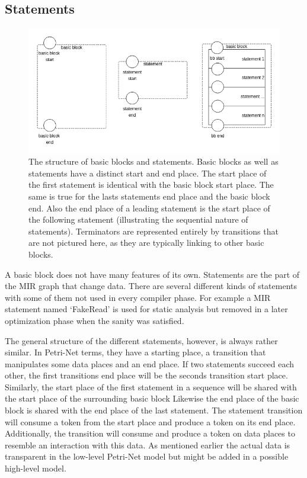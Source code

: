 \subsection{Statements}
\begin{figure}
    \centering
    \includegraphics[width=.9\textwidth]{../diagrams/basic_blocks.png}
    \caption{
        The structure of basic blocks and statements.
        Basic blocks as well as statements have a distinct start and end place.
        The start place of the first statement is identical with the basic block start place.
        The same is true for the lasts statements end place and the basic block end.
        Also the end place of a leading statement is the start place of the following statement (illustrating the sequential nature of statements).
        Terminators are represented entirely by transitions that are not pictured here, as they are typically linking to other basic blocks.
    }
    \label{basic_block_trans}
\end{figure}A basic block does not have many features of its own.
Statements are the part of the MIR graph that change data.
There are several different kinds of statements with some of them not used in every compiler phase.
For example a MIR statement named `FakeRead' is used for static analysis but removed in a later optimization phase when the sanity was satisfied.

The general structure of the different statements, however, is always rather similar.
In Petri-Net terms, they have a starting place, a transition that manipulates some data places and an end place.
If two statements succeed each other, the first transitions end place will be the seconds transition start place.
Similarly, the start place of the first statement in a sequence will be shared with the start place of the surrounding basic block
Likewise the end place of the basic block is shared with the end place of the last statement.
The statement transition will consume a token from the start place and produce a token on its end place.
Additionally, the transition will consume and produce a token on data places to resemble an interaction with this data.
As mentioned earlier the actual data is transparent in the low-level Petri-Net model but might be added in a possible high-level model.

